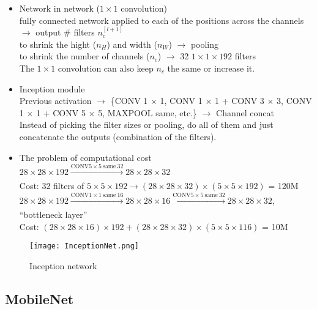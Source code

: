 \begin{itemize}
\begin{itemize}
        \item
        Network in network ($1 \times 1$ convolution)\\
        fully connected network applied to each of the positions across the channels $\rightarrow$ output \# filters $n_c^{[l+1]}$\\
        to shrink the hight ($n_H$) and width ($n_W$) $\rightarrow$ pooling\\
        to shrink the number of channels ($n_c$) $\rightarrow$ 32 $1 \times 1 \times 192$ filters\\
        The $1 \times 1$ convolution can also keep $n_c$ the same or increase it.
        \item
        Inception module\\
        Previous activation $\rightarrow$ \{CONV 1 $\times$ 1, CONV 1 $\times$ 1 + CONV 3 $\times$ 3,  CONV 1 $\times$ 1 + CONV 5 $\times$ 5, MAXPOOL same, etc.\} $\rightarrow$ Channel concat\\
        Instead of picking the filter sizes or pooling, do all of them and just concatenate the outputs (combination of the filters).
        \item
        The problem of computational cost\\
        $28 \times 28 \times 192 \xrightarrow[]{\text{CONV} 5 \times 5 ~ \text{same} ~ 32} 28 \times 28 \times 32$\\
        Cost: 32 filters of $5 \times 5 \times 192 \rightarrow  (28 \times 28 \times 32) \times (5 \times 5 \times 192)$ = 120M\\
        $28 \times 28 \times 192 \xrightarrow[]{\text{CONV} 1 \times 1 ~ \text{same} ~ 16} 28 \times 28 \times 16 \xrightarrow[]{\text{CONV} 5 \times 5 ~ \text{same} ~ 32} 28 \times 28 \times 32$, ``bottleneck layer''\\
        Cost: $ (28 \times 28 \times 16) \times 192 + (28 \times 28 \times 32) \times (5 \times 5 \times 116)$ = 10M
    \end{itemize}
     \begin{figure}[h]
        \centering
        \texttt{[image: InceptionNet.png]}
        \caption{ Inception network}
        \label{fig:Inception}
    \end{figure}
\end{itemize}

%
\subsection{MobileNet}


